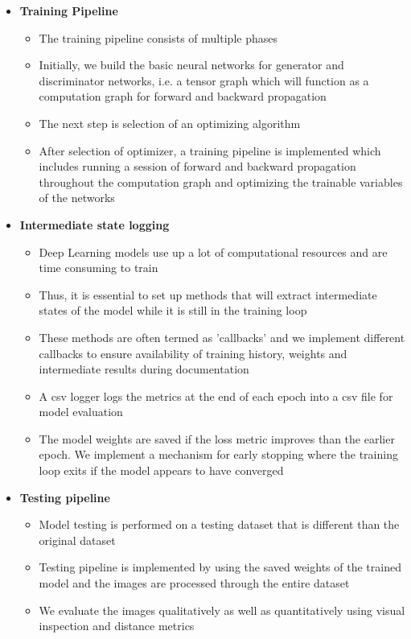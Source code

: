 \documentclass[oneside,a4paper,12pt]{report}
\begin{document}
\begin{itemize}
	\item \textbf{Training Pipeline}
	\begin{itemize}
		\item The training pipeline consists of multiple phases
		\item Initially, we build the basic neural networks for generator and discriminator networks, i.e. a tensor graph which will function as a computation graph for forward and backward propagation
		\item The next step is selection of an optimizing algorithm
		\item After selection of optimizer, a training pipeline is implemented which includes running a session of forward and backward propagation throughout the computation graph and optimizing the trainable variables of the networks
	\end{itemize}
	\item \textbf{Intermediate state logging}
	\begin{itemize}
		\item Deep Learning models use up a lot of computational resources and are time consuming to train
		\item Thus, it is essential to set up methods that will extract intermediate states of the model while it is still in the training loop
		\item These methods are often termed as 'callbacks' and we implement different callbacks to ensure availability of training history, weights and intermediate results during documentation
		\item A csv logger logs the metrics at the end of each epoch into a csv file for model evaluation
		\item The model weights are saved if the loss metric improves than the earlier epoch. We implement a mechanism for early stopping where the training loop exits if the model appears to have converged
	\end{itemize}
	\item \textbf{Testing pipeline}
	\begin{itemize}
		\item Model testing is performed on a testing dataset that is different than the original dataset
		\item Testing pipeline is implemented by using the saved weights of the trained model and the images are processed through the entire dataset
		\item We evaluate the images qualitatively as well as quantitatively using visual inspection and distance metrics
	\end{itemize}
\end{itemize}
\end{document}
